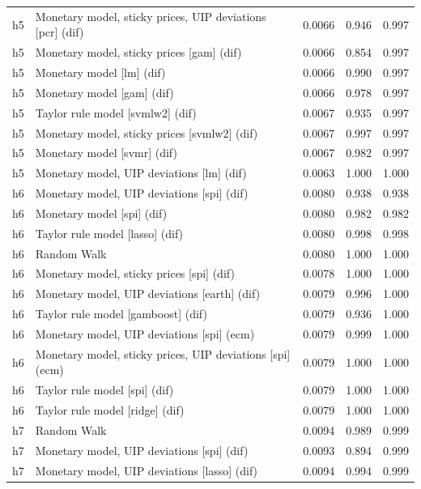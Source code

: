 \begin{ThreePartTable}
\begin{longtable}[t]{cp{5.5cm}ccc}
h5 & \raggedright Monetary model, sticky prices, UIP deviations [pcr] (dif) & 0.0066 & 0.946 & 0.997\\
h5 & \raggedright Monetary model, sticky prices [gam] (dif) & 0.0066 & 0.854 & 0.997\\
h5 & \raggedright Monetary model [lm] (dif) & 0.0066 & 0.990 & 0.997\\
h5 & \raggedright Monetary model [gam] (dif) & 0.0066 & 0.978 & 0.997\\
h5 & \raggedright Taylor rule model [svmlw2] (dif) & 0.0067 & 0.935 & 0.997\\
h5 & \raggedright Monetary model, sticky prices [svmlw2] (dif) & 0.0067 & 0.997 & 0.997\\
h5 & \raggedright Monetary model [svmr] (dif) & 0.0067 & 0.982 & 0.997\\
h5 & \raggedright Monetary model, UIP deviations [lm] (dif) & 0.0063 & 1.000 & 1.000\\
\addlinespace
h6 & \raggedright Monetary model, UIP deviations [spi] (dif) & 0.0080 & 0.938 & 0.938\\
h6 & \raggedright Monetary model [spi] (dif) & 0.0080 & 0.982 & 0.982\\
h6 & \raggedright Taylor rule model [lasso] (dif) & 0.0080 & 0.998 & 0.998\\
h6 & \raggedright Random Walk & 0.0080 & 1.000 & 1.000\\
h6 & \raggedright Monetary model, sticky prices [spi] (dif) & 0.0078 & 1.000 & 1.000\\
h6 & \raggedright Monetary model, UIP deviations [earth] (dif) & 0.0079 & 0.996 & 1.000\\
h6 & \raggedright Taylor rule model [gamboost] (dif) & 0.0079 & 0.936 & 1.000\\
h6 & \raggedright Monetary model, UIP deviations [spi] (ecm) & 0.0079 & 0.999 & 1.000\\
h6 & \raggedright Monetary model, sticky prices, UIP deviations [spi] (ecm) & 0.0079 & 1.000 & 1.000\\
h6 & \raggedright Taylor rule model [spi] (dif) & 0.0079 & 1.000 & 1.000\\
h6 & \raggedright Taylor rule model [ridge] (dif) & 0.0079 & 1.000 & 1.000\\
\addlinespace
h7 & \raggedright Random Walk & 0.0094 & 0.989 & 0.999\\
h7 & \raggedright Monetary model, UIP deviations [spi] (dif) & 0.0093 & 0.894 & 0.999\\
h7 & \raggedright Monetary model, UIP deviations [lasso] (dif) & 0.0094 & 0.994 & 0.999\\

\end{longtable}
\end{ThreePartTable}
